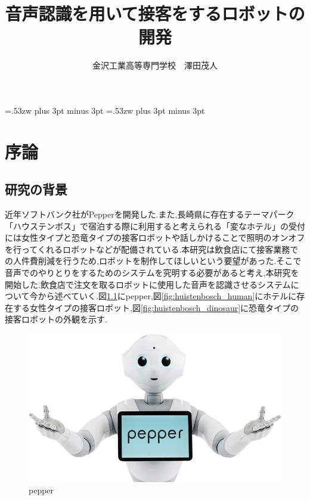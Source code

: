 \documentclass[12pt,oneside]{sotsuken_paper}
\begin{document}
\title{音声認識を用いて接客をするロボットの開発}

\author{金沢工業高等専門学校　澤田茂人}

\setlength{\baselineskip}{9truemm}

\kanJiskip=.53zw plus 3pt minus 3pt
\xkanJiskip=.53zw plus 3pt minus 3pt

\tableofcontents


\chapter{序論}
\section{研究の背景}
近年ソフトバンク社がPepperを開発した.また,長崎県に存在するテーマパーク「ハウステンボス」で宿泊する際に利用すると考えられる「変なホテル」の受付には女性タイプと恐竜タイプの接客ロボットや話しかけることで照明のオンオフを行ってくれるロボットなどが配備されている.本研究は飲食店にて接客業務での人件費削減を行うため,ロボットを制作してほしいという要望があった.そこで音声でのやりとりをするためのシステムを究明する必要があると考え,本研究を開始した.飲食店で注文を取るロボットに使用した音声を認識させるシステムについて今から述べていく.図\ref{fig:hospitality-robot}にpepper,図\ref{fig:huistenbosch_human}にホテルに存在する女性タイプの接客ロボット,図\ref{fig:huistenbosch_dinosaur}に恐竜タイプの接客ロボットの外観を示す.


\begin{figure}[htbp]
\begin{center}
\includegraphics[width=120mm]{img/pepper.png}
\caption{pepper}
\label{fig:hospitality-robot}
\end{center}
\end{figure}
\end{document}
